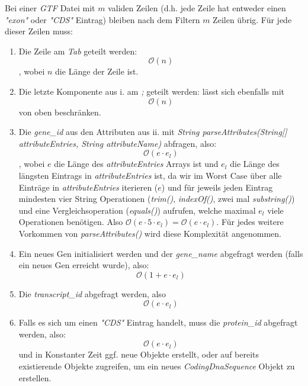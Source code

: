 \documentclass[12pt]{article}
\begin{document}
\begin{enumerate}
		Bei einer \textit{GTF} Datei mit $m$ validen Zeilen (d.h. jede Zeile hat entweder einen \textit{"exon"} oder \textit{"CDS"} Eintrag) bleiben
		nach dem Filtern $m$ Zeilen übrig.
		Für jede dieser Zeilen muss:
		\begin{enumerate}
			\item Die Zeile am \textit{Tab} geteilt werden:
			      \begin{equation}
				      \mathcal{O}(n)
			      \end{equation}
			      , wobei $n$ die Länge der Zeile ist.
			\item Die letzte Komponente aus i. am \textit{;} geteilt werden: lässt sich ebenfalls mit
			      \begin{equation}
				      \mathcal{O}(n)
			      \end{equation}
			      von oben beschränken.
			\item Die \textit{gene\_id} aus den Attributen aus ii. mit \textit{String parseAttributes(String[] attributeEntries, String attributeName)}
			      abfragen, also:
			      \begin{equation}
				      \mathcal{O}(e \cdot e_{l})
			      \end{equation}
			      , wobei $e$ die Länge des \textit{attributeEntries} Arrays ist und
			      $e_{l}$ die Länge des längsten Eintrags in \textit{attributeEntries} ist, da wir im Worst Case
			      über alle Einträge in \textit{attributeEntries} iterieren ($e$) und für jeweils jeden Eintrag
			      mindesten vier String Operationen (\textit{trim()}, \textit{indexOf()}, zwei mal \textit{substring()})
			      und eine Vergleichsoperation (\textit{equals()}) aufrufen, welche maximal $e_{l}$ viele
			      Operationen benötigen. Also $\mathcal{O}(e \cdot 5 \cdot e_{l}) = \mathcal{O}(e \cdot e_{l})$.
			      Für jedes weitere Vorkommen von \textit{parseAttributes()} wird diese Komplexität angenommen.
			\item Ein neues Gen initialisiert werden und der \textit{gene\_name} abgefragt werden (falls ein neues Gen erreicht wurde), also:
			      \begin{equation}
				      \mathcal{O}(1 + e \cdot e_{l})
			      \end{equation}
			\item Die \textit{transcript\_id} abgefragt werden, also
			      \begin{equation}
				      \mathcal{O}(e \cdot e_{l})
			      \end{equation}
			\item Falls es sich um einen \textit{"CDS"} Eintrag handelt, muss die \textit{protein\_id} abgefragt werden, also:
			      \begin{equation}
				      \mathcal{O}(e \cdot e_{l})
			      \end{equation}
			      und in Konstanter Zeit ggf. neue Objekte erstellt, oder auf bereits existierende Objekte
			      zugreifen, um ein neues \textit{CodingDnaSequence} Objekt zu erstellen.
		\end{enumerate}


\end{enumerate}
\end{document}
